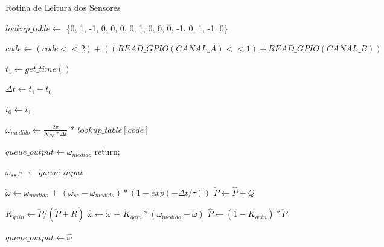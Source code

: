 \begin{algorithm}
\caption{Rotina de Leitura dos Sensores}
\label{alg:rotina_leitura_sensores}
\begin{algorithmic}[1]
  \State $lookup\_table \gets $ \{0, 1, -1, 0, 0, 0, 0, 1, 0, 0, 0, -1, 0, 1, -1, 0\}

  \State $code \gets (code << 2) + ((READ\_GPIO(CANAL\_A) << 1) + READ\_GPIO(CANAL\_B))$

  \State $t_1 \gets get\_time()$ 
  
  \State $\Delta{t} \gets  t_1 - t_0$
  
  \State $t_0 \gets t_1$ 
  
  \State $\omega_{medido} \gets \frac{2\pi}{N_{PR}*\Delta{t}}$ * $lookup\_table[code]$
  
   
    \State $queue\_output \gets \omega_{medido}$  
    \State return;
  \EndIf
  
  \State $\omega_{ss}$,$\tau$ $\gets  queue\_input$

  \State $\check{\omega} \gets \omega_{medido}$ + $( \omega_{ss} - \omega_{medido} ) * (1 - exp(-\Delta{t}/\tau))$
  \State $\check{P} \gets \hat{P} + Q$


  \State $K_{gain} \gets \check{P} / (\check{P} + R)$
  \State $\hat{\omega} \gets \check{\omega}$ + $K_{gain} * (\omega_{medido} - \check{\omega})$
  \State $\hat{P} \gets (1 - K_{gain}) * \check{P}$ 
  
  \State $queue\_output \gets \hat{\omega}$
\end{algorithmic}
\end{algorithm}

